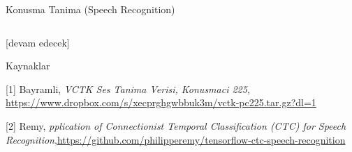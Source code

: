 \documentclass[12pt,fleqn]{article}\usepackage{../../common}
\begin{document}
Konusma Tanima (Speech Recognition)






\inputminted[fontsize=\footnotesize]{python}{train.py}


[devam edecek]

Kaynaklar

[1] Bayramli, {\em VCTK Ses Tanima Verisi, Konusmaci 225}, \url{https://www.dropbox.com/s/xecprghgwbbuk3m/vctk-pc225.tar.gz?dl=1}

[2] Remy, {\em pplication of Connectionist Temporal Classification (CTC) for Speech Recognition},\url{https://github.com/philipperemy/tensorflow-ctc-speech-recognition}
\end{document}
